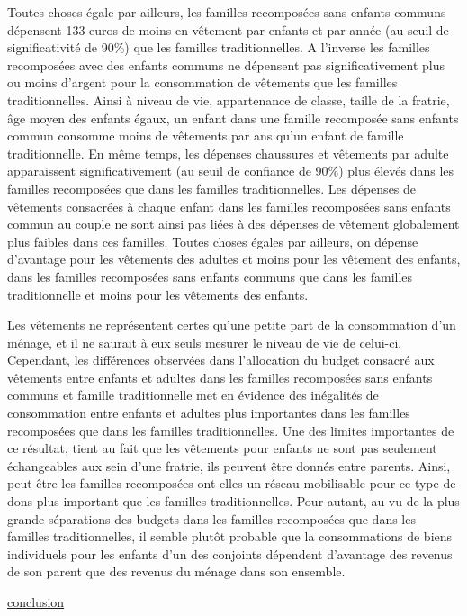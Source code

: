 \documentclass[
  12pt,
]{book}
\begin{document}
Toutes choses égale par ailleurs, les familles recomposées sans enfants
communs dépensent 133 euros de moins en vêtement par enfants et par
année (au seuil de significativité de 90\%) que les familles
traditionnelles. A l'inverse les familles recomposées avec des enfants
communs ne dépensent pas significativement plus ou moins d'argent pour
la consommation de vêtements que les familles traditionnelles. Ainsi à
niveau de vie, appartenance de classe, taille de la fratrie, âge moyen
des enfants égaux, un enfant dans une famille recomposée sans enfants
commun consomme moins de vêtements par ans qu'un enfant de famille
traditionnelle. En même temps, les dépenses chaussures et vêtements par
adulte apparaissent significativement (au seuil de confiance de 90\%)
plus élevés dans les familles recomposées que dans les familles
traditionnelles. Les dépenses de vêtements consacrées à chaque enfant
dans les familles recomposées sans enfants commun au couple ne sont
ainsi pas liées à des dépenses de vêtement globalement plus faibles dans
ces familles. Toutes choses égales par ailleurs, on dépense d'avantage
pour les vêtements des adultes et moins pour les vêtement des enfants,
dans les familles recomposées sans enfants communs que dans les familles
traditionnelle et moins pour les vêtements des enfants.

Les vêtements ne représentent certes qu'une petite part de la
consommation d'un ménage, et il ne saurait à eux seuls mesurer le niveau
de vie de celui-ci. Cependant, les différences observées dans
l'allocation du budget consacré aux vêtements entre enfants et adultes
dans les familles recomposées sans enfants communs et famille
traditionnelle met en évidence des inégalités de consommation entre
enfants et adultes plus importantes dans les familles recomposées que
dans les familles traditionnelles. Une des limites importantes de ce
résultat, tient au fait que les vêtements pour enfants ne sont pas
seulement échangeables aux sein d'une fratrie, ils peuvent être donnés
entre parents. Ainsi, peut-être les familles recomposées ont-elles un
réseau mobilisable pour ce type de dons plus important que les familles
traditionnelles. Pour autant, au vu de la plus grande séparations des
budgets dans les familles recomposées que dans les familles
traditionnelles, il semble plutôt probable que la consommations de biens
individuels pour les enfants d'un des conjoints dépendent d'avantage des
revenus de son parent que des revenus du ménage dans son ensemble.

\hyperref[conclusion]{conclusion}
\end{document}
